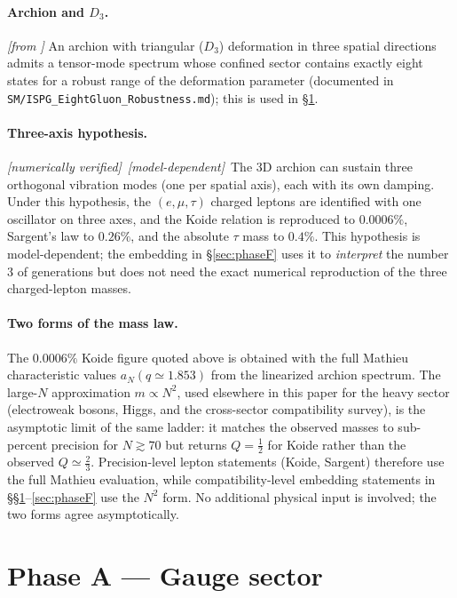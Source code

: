 \documentclass[11pt]{article}
\newcommand{\fromISPG}[1]{\textit{[from #1]}}
\newcommand{\numerical}{\textit{[numerically verified]}}
\newcommand{\modeldep}{\textit{[model-dependent]}}
\begin{document}
\paragraph{Archion and $D_3$.} \fromISPG{\cite{Lotishvili2026Q}}
An archion with triangular ($D_3$) deformation in three spatial
directions admits a tensor-mode spectrum whose confined sector
contains exactly eight states for a robust range of the
deformation parameter (documented in
\texttt{SM/ISPG\_EightGluon\_Robustness.md});
this is used in \S\ref{sec:phaseA}.

\paragraph{Three-axis hypothesis.} \numerical\ \modeldep\
The 3D archion can sustain three orthogonal vibration modes
(one per spatial axis), each with its own damping. Under this
hypothesis, the $(e,\mu,\tau)$ charged leptons are identified
with one oscillator on three axes, and the Koide relation is
reproduced to $0.0006\%$, Sargent's law to $0.26\%$, and the
absolute $\tau$ mass to $0.4\%$. This hypothesis is model-dependent; the
embedding in \S\ref{sec:phaseF} uses it to \emph{interpret}
the number $3$ of generations but does not need the exact
numerical reproduction of the three charged-lepton masses.

\paragraph{Two forms of the mass law.}
The $0.0006\%$ Koide figure quoted above is obtained with the
full Mathieu characteristic values $a_N(q\!\simeq\!1.853)$ from
the linearized archion spectrum. The large-$N$ approximation
$m\propto N^2$, used elsewhere in this paper for the heavy
sector (electroweak bosons, Higgs, and the cross-sector
compatibility survey), is the asymptotic limit of the same
ladder: it matches the observed masses to sub-percent precision
for $N\gtrsim 70$ but returns $Q=\tfrac12$ for Koide rather than
the observed $Q\simeq\tfrac23$. Precision-level lepton
statements (Koide, Sargent) therefore use the full Mathieu
evaluation, while compatibility-level embedding statements in
\S\S\ref{sec:phaseA}--\ref{sec:phaseF} use the $N^2$ form. No
additional physical input is involved; the two forms agree
asymptotically.

\section{Phase A --- Gauge sector}
\label{sec:phaseA}
\end{document}
